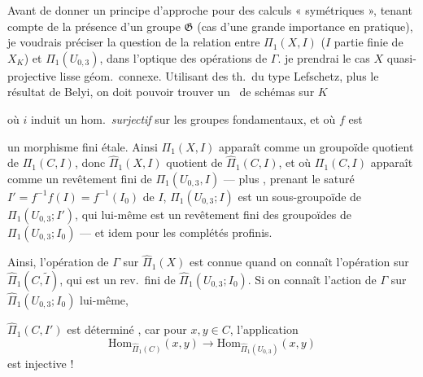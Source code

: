 \documentclass[11pt,a4paper]{article}
\begin{document}
Avant de donner un principe d'approche pour des calculs « symétriques », tenant compte de la présence d'un groupe $\mathfrak{G}$ (cas d'une grande importance en pratique), je voudrais préciser la question de la relation entre $\Pi_1(X, I)$ ($I$ partie finie de $X_K$) et $\Pi_1(U_{0,3})$, \struck{\ill{}} dans l'optique des opérations de $\Gamma$.  je prendrai le cas $X$ quasi-projective lisse géom.\ connexe. Utilisant des th.\ du type Lefschetz, plus le résultat de  Belyi, on \struck{\ill{}} doit pouvoir trouver un \ de schémas sur $K$



où $i$ induit un hom.\ \textit{surjectif} sur les groupes fondamentaux, et où $f$ est

un morphisme fini étale. Ainsi $\Pi_1(X, I)$ apparaît comme un groupoïde quotient de $\Pi_1(C, I)$, donc $\hat{\Pi}_1(X, I)$ quotient de $\hat{\Pi}_1(C, I)$, et où $\Pi_1(C, I)$ apparaît comme un revêtement fini de $\Pi_1(U_{0,3}, I)$ --- plus  , prenant le saturé $I' = f^{-1}f(I) = f^{-1}(I_0)$ de $I$, $\Pi_1(U_{0,3}; I)$ est un sous-groupoïde  de $\Pi_1(U_{0,3}; I')$, qui lui-même est un revêtement fini des groupoïdes de $\Pi_1(U_{0,3}; I_0)$ --- et idem pour les complétés profinis.

Ainsi, l'opération de $\Gamma$ sur $\hat{\Pi}_1(X)$ est connue quand on connaît l'opération sur $\hat{\Pi}_1(C, \tilde{I})$, qui est un rev.\ fini de $\hat{\Pi}_1(U_{0,3}; I_0)$. Si on connaît l'action de $\Gamma$ sur $\hat{\Pi}_1(U_{0,3}; I_0)$ lui-même, 

$\hat{\Pi}_1(C, I')$ est déterminé , car pour $x, y \in C$, l'application
\[
  \mathrm{Hom}_{\hat{\Pi}_1(C)}(x, y) \longrightarrow \mathrm{Hom}_{\hat{\Pi}_1(U_{0,3})}(x, y)
\]
est injective !
\end{document}
